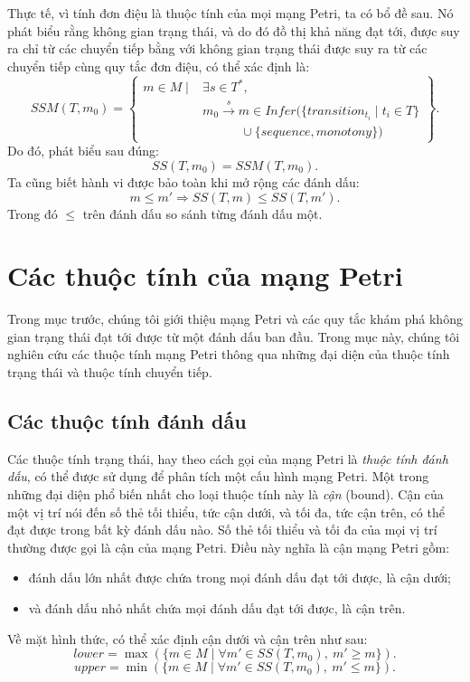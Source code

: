 Thực tế, vì tính đơn điệu là thuộc tính của mọi mạng Petri, ta có bổ đề sau. Nó phát biểu rằng không gian trạng thái, và do đó đồ thị khả năng đạt tới, được suy ra chỉ từ các chuyển tiếp bằng với không gian trạng thái được suy ra từ các chuyển tiếp cùng quy tắc đơn điệu, có thể xác định là:
\begin{equation}
SSM(T,m_0)=\left\{\begin{aligned}
m\in M\mid{}&\exists s\in T^*,\\
&m_0\xrightarrow{s}m\in Infer(\{transition_{t_i}\mid t_i\in T\}\\
&\qquad\quad\cup\{sequence,monotony\})
\end{aligned}\right\}.\tag{7.8}
\end{equation}
Do đó, phát biểu sau đúng:
\begin{equation}
SS(T,m_0)=SSM(T,m_0).\tag{7.9}
\end{equation}
Ta cũng biết hành vi được bảo toàn khi mở rộng các đánh dấu:
\begin{equation}
m\leq m'\Rightarrow SS(T,m)\leq SS(T,m').\tag{7.10}
\end{equation}
Trong đó $\leq$ trên đánh dấu so sánh từng đánh dấu một.

\section{Các thuộc tính của mạng Petri}
Trong mục trước, chúng tôi giới thiệu mạng Petri và các quy tắc khám phá không gian trạng thái đạt tới được từ một đánh dấu ban đầu. Trong mục này, chúng tôi nghiên cứu các thuộc tính mạng Petri thông qua những đại diện của thuộc tính trạng thái và thuộc tính chuyển tiếp.

\subsection{Các thuộc tính đánh dấu}
Các thuộc tính trạng thái, hay theo cách gọi của mạng Petri là \emph{thuộc tính đánh dấu}, có thể được sử dụng để phân tích một cấu hình mạng Petri. Một trong những đại diện phổ biến nhất cho loại thuộc tính này là \emph{cận} (bound). Cận của một vị trí nói đến số thẻ tối thiểu, tức cận dưới, và tối đa, tức cận trên, có thể đạt được trong bất kỳ đánh dấu nào. Số thẻ tối thiểu và tối đa của mọi vị trí thường được gọi là cận của mạng Petri. Điều này nghĩa là cận mạng Petri gồm:
\begin{itemize}
\item đánh dấu lớn nhất được chứa trong mọi đánh dấu đạt tới được, là cận dưới;
\item và đánh dấu nhỏ nhất chứa mọi đánh dấu đạt tới được, là cận trên.
\end{itemize}
Về mặt hình thức, có thể xác định cận dưới và cận trên như sau:
\begin{equation}
lower=\max(\{m\in M\mid\forall m'\in SS(T,m_0),\ m'\geqslant m\}).\tag{7.11}
\end{equation}
\begin{equation}
upper=\min(\{m\in M\mid\forall m'\in SS(T,m_0),\ m'\leqslant m\}).\tag{7.12}
\end{equation}

